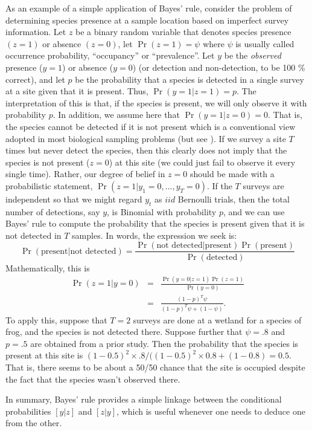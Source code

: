 As an example of a simple application of Bayes' rule,
consider the problem of determining species presence at a sample
location based on imperfect survey information. Let $z$ be a binary
random variable that denotes species presence $(z=1)$ or absence
$(z=0)$, let $\Pr(z=1) = \psi$ where $\psi$ is usually called
occurrence probability, ``occupancy'' \citep{mackenzie_etal:2002} or ``prevalence''.
Let $y$ be the {\it observed} presence
($y=1$) or absence ($y=0$) (or detection and non-detection, to be 100 \% correct), and let $p$ be the probability that a
species is detected in a single survey at a site given that it is
present. Thus, $\Pr(y=1|z=1)=p$. The interpretation of this is that,
if the species is present, we will only observe it with
probability $p$. In addition, we assume here that $\Pr(y=1|z=0) =
0$. That is, the species cannot be detected if it is not present which
is a conventional view adopted in most biological sampling problems (but
see \citet{royle_link:2006}).
If we survey a site $T$ times but never detect the species,
then this clearly does not imply that the species is not present
($z=0$) at this site (we could just fail to observe it every single time). Rather, our degree of belief in $z=0$ should be
made with a probabilistic statement,
$\Pr(z=1|y_1=0,\ldots,y_{T}=0)$. If the $T$ surveys are independent so
that we might regard $y_{t}$ as $iid$ Bernoulli trials, then the total
number of detections, say $y$, is Binomial with probability $p$, and
we can use Bayes' rule to compute the probability that the species is present
given that it is not detected in $T$ samples. In words, the expression
we seek is:
\[
\Pr(\mbox{present} | \mbox{not detected}) = \frac{\Pr(\mbox{not detected} |
  \mbox{present})\Pr(\mbox{present})}{\Pr(\mbox{detected})}
\]
Mathematically, this is
\begin{eqnarray*}
\Pr(z=1|y=0) &= &\frac{\Pr(y=0|z=1)\Pr(z=1)}{\Pr(y=0) } \\
             &= & \frac{(1-p)^{T} \psi}{ (1-p)^T \psi + (1-\psi) }.
\end{eqnarray*}
To apply this,
suppose that $T=2$ surveys are done at a wetland for a species of
frog, and the species is not detected there. Suppose further that $\psi
= .8$ and $p = .5$ are obtained from a prior study.  Then the
probability that the species is present at this site is
$(1-0.5)^2 \times.8/((1-0.5)^2 \times 0.8 + (1-0.8) = 0.5$. 
That is, there seems to be about a
50/50 chance that the site is occupied despite the fact that the
species wasn't observed there.

In summary, Bayes' rule provides a simple linkage between the
conditional probabilities $[y|z]$ and $[z|y]$, which is useful whenever
one needs to deduce one from the other.

